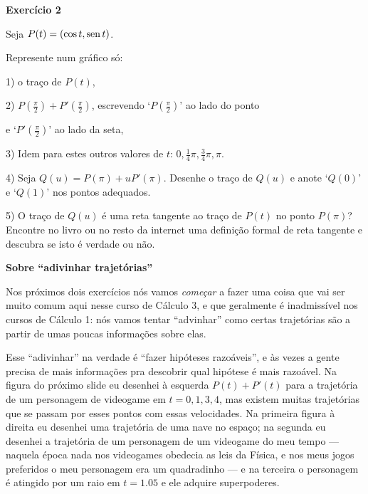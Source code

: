 \documentclass[oneside,12pt]{article}
\begin{document}
\newpage


{\bf Exercício 2}

Seja $P(t) = (\cos t, \operatorname{sen} t)$.

Represente num gráfico só:

1) o traço de $P(t)$,

2) $P(\frac{π}{2}) + P'(\frac{π}{2})$, escrevendo `$P(\frac{π}{2})$'
ao lado do ponto

e `$P'(\frac{π}{2})$' ao lado da seta,

3) Idem para estes outros valores de $t$: $0, \frac14π, \frac34π, π$.

4) Seja $Q(u) = P(π) + uP'(π)$. Desenhe o traço de $Q(u)$ e anote
`$Q(0)$' e `$Q(1)$' nos pontos adequados.

\msk

5) O traço de $Q(u)$ é uma reta tangente ao traço de $P(t)$ no ponto
$P(π)$? Encontre no livro ou no resto da internet uma definição formal
de reta tangente e descubra se isto é verdade ou não.


\newpage


{\bf Sobre ``adivinhar trajetórias''}

Nos próximos dois exercícios nós vamos {\sl começar} a fazer uma coisa
que vai ser muito comum aqui nesse curso de Cálculo 3, e que
geralmente é inadmissível nos cursos de Cálculo 1: nós vamos tentar
``advinhar'' como certas trajetórias são a partir de umas poucas
informações sobre elas.

Esse ``adivinhar'' na verdade é ``fazer hipóteses razoáveis'', e às
vezes a gente precisa de mais informações pra descobrir qual hipótese
é mais razoável. Na figura do próximo slide eu desenhei à esquerda
$P(t)+P'(t)$ para a trajetória de um personagem de videogame em
$t=0,1,3,4$, mas existem muitas trajetórias que se passam por esses
pontos com essas velocidades. Na primeira figura à direita eu desenhei
uma trajetória de uma nave no espaço; na segunda eu desenhei a
trajetória de um personagem de um videogame do meu tempo --- naquela
época nada nos videogames obedecia as leis da Física, e nos meus jogos
preferidos o meu personagem era um quadradinho --- e na terceira o
personagem é atingido por um raio em $t=1.05$ e ele adquire
superpoderes.
\end{document}
